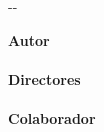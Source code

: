 {\begin{cambiamargen}{-\cambioIzquierdo}{-\cambioDerecho}
\begin{center}
\end{center}

\vfill

\begin{large}
\begin{center}
{\Large \bfseries Autor}\\
\textbf{\autorPortadaVal}\\[0.5cm]
{\Large \bfseries Directores}\\
\textbf{\directorPortadaVal}\\[0.5cm]
\ifx\colaboradorPortadaVal\empty\else
{\Large \bfseries Colaborador}\\
\textbf{\colaboradorPortadaVal}\\[0.5cm]
\fi
\textbf{\institucionVal}\\[1em]
\end{center}
\end{large}

\vfill

\end{cambiamargen}

\newpage

\thispagestyle{empty}
\mbox{ }


\newpage

\thispagestyle{empty}

\mbox{ }

\begin{Huge}
\begin{center}
\tituloPortadaVal \\
\tituloPortadaEngVal
\end{center}
\end{Huge}

}
